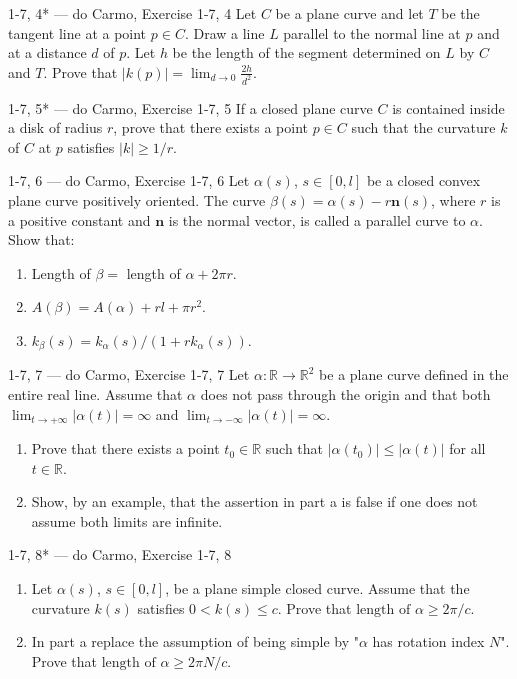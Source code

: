 \begin{exercise}{1-7, 4* — do Carmo, Exercise 1-7, 4}
Let $C$ be a plane curve and let $T$ be the tangent line at a point $p \in C$. Draw a line $L$ parallel to the normal line at $p$ and at a distance $d$ of $p$. Let $h$ be the length of the segment determined on $L$ by $C$ and $T$. Prove that $|k(p)| = \lim_{d \to 0} \frac{2h}{d^2}$.
\end{exercise}

\begin{exercise}{1-7, 5* — do Carmo, Exercise 1-7, 5}
If a closed plane curve $C$ is contained inside a disk of radius $r$, prove that there exists a point $p \in C$ such that the curvature $k$ of $C$ at $p$ satisfies $|k| \geq 1/r$.
\end{exercise}

\begin{exercise}{1-7, 6 — do Carmo, Exercise 1-7, 6}
Let $\alpha(s)$, $s \in [0, l]$ be a closed convex plane curve positively oriented. The curve $\beta(s) = \alpha(s) - r\mathbf{n}(s)$, where $r$ is a positive constant and $\mathbf{n}$ is the normal vector, is called a parallel curve to $\alpha$. Show that:
\begin{enumerate}
\item[a.] Length of $\beta = $ length of $\alpha + 2\pi r$.
\item[b.] $A(\beta) = A(\alpha) + rl + \pi r^2$.
\item[c.] $k_\beta(s) = k_\alpha(s) / (1 + r k_\alpha(s))$.
\end{enumerate}
\end{exercise}

\begin{exercise}{1-7, 7 — do Carmo, Exercise 1-7, 7}
Let $\alpha: \mathbb{R} \to \mathbb{R}^2$ be a plane curve defined in the entire real line. Assume that $\alpha$ does not pass through the origin and that both $\lim_{t \to +\infty} |\alpha(t)| = \infty$ and $\lim_{t \to -\infty} |\alpha(t)| = \infty$.
\begin{enumerate}
\item[a.] Prove that there exists a point $t_0 \in \mathbb{R}$ such that $|\alpha(t_0)| \leq |\alpha(t)|$ for all $t \in \mathbb{R}$.
\item[b.] Show, by an example, that the assertion in part a is false if one does not assume both limits are infinite.
\end{enumerate}
\end{exercise}

\begin{exercise}{1-7, 8* — do Carmo, Exercise 1-7, 8}
\begin{enumerate}
\item[a.] Let $\alpha(s)$, $s \in [0, l]$, be a plane simple closed curve. Assume that the curvature $k(s)$ satisfies $0 < k(s) \leq c$. Prove that $\text{length of } \alpha \geq 2\pi/c$.
\item[b.] In part a replace the assumption of being simple by "$\alpha$ has rotation index $N$". Prove that $\text{length of } \alpha \geq 2\pi N/c$.
\end{enumerate}
\end{exercise}

